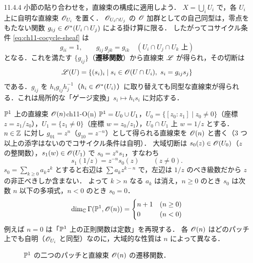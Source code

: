 11.4.4 小節の貼り合わせを，直線束の構成に適用しよう．
$X=\bigcup_iU_i$ で，各 $U_i$ 上に自明な直線束 $\mathscr{O}_{U_i}$ を置く．
$\mathscr{O}_{U_i\cap U_j}$ の $\mathscr{O}$ 加群としての自己同型は，零点をもたない関数 $g_{ij}\in\mathscr{O}^*(U_i\cap U_j)$ による掛け算に限る．
したがってコサイクル条件 \eqref{eq:ch11-cocycle-sheaf} は
\begin{equation}\label{eq:ch11-cocycle}
  g_{ii}=1,\qquad g_{ij}\,g_{jk}=g_{ik}\quad (U_i\cap U_j\cap U_k\text{ 上})
\end{equation}
となる．これを満たす $\{g_{ij}\}$（\textbf{遷移関数}）から直線束 $\mathscr{L}$ が得られ，その切断は
\[
  \sheaf{L}(U)=\{(s_i)_i\mid s_i\in\OO(U\cap U_i),\ s_i=g_{ij}s_j\}
\]
である．$g_{ij}$ を $h_i g_{ij}h_j^{-1}$（$h_i\in\mathscr{O}^*(U_i)$）に取り替えても同型な直線束が得られる．これは局所的な「ゲージ変換」$s_i\mapsto h_is_i$ に対応する．

\begin{myex}{$\mathbb{P}^1$ 上の直線束 $\mathscr{O}(n)$}{ch11-O(n)}
$\mathbb{P}^1=U_0\cup U_1$，$U_0=\{[z_0:z_1]\mid z_0\ne0\}$（座標 $z=z_1/z_0$），$U_1=\{z_1\ne0\}$（座標 $w=z_0/z_1$），$U_0\cap U_1$ 上 $w=1/z$ とする．
$n\in\mathbb{Z}$ に対し $g_{01}=z^{n}$（$g_{10}=z^{-n}$）として得られる直線束を $\mathscr{O}(n)$ と書く（3 つ以上の添字はないのでコサイクル条件は自明）．
大域切断は $s_0(z)\in\mathscr{O}(U_0)$（$z$ の整関数），$s_1(w)\in\mathscr{O}(U_1)$ で $s_0=z^{n}s_1$，すなわち
\[
  s_1(1/z) = z^{-n}s_0(z)\qquad (z\ne0).
\]
$s_0=\sum_{k\ge0}a_kz^k$ とすると右辺は $\sum a_kz^{k-n}$ で，左辺は $1/z$ のべき級数だから $z$ の非正べきしか含まない．
よって $k>n$ なる $a_k$ は消え，$n\ge0$ のとき $s_0$ は次数 $n$ 以下の多項式，$n<0$ のとき $s_0=0$．
\[
  \dim_{\mathbb{C}}\Gamma(\mathbb{P}^1,\mathscr{O}(n)) = \begin{cases} n+1 & (n\ge0)\\ 0 & (n<0)\end{cases}
\]
例えば $n=0$ は「$\mathbb{P}^1$ 上の正則関数は定数」を再現する．
各 $\mathscr{O}(n)$ はどのパッチ上でも自明（$\mathscr{O}_{U_i}$ と同型）なのに，大域的な性質は $n$ によって異なる．
\end{myex}

\begin{figure}[htbp]
\centering
{}
\caption{$\mathbb{P}^1$ の二つのパッチと直線束 $\mathscr{O}(n)$ の遷移関数．}
\label{fig:ch11-P1}
\end{figure}

